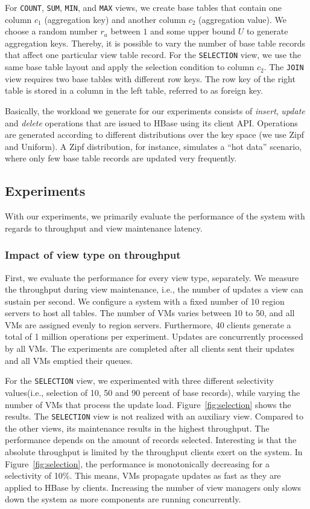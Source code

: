 For \texttt{COUNT}, \texttt{SUM}, \texttt{MIN}, and \texttt{MAX}
views, we create base tables that contain one column $c_1$
(aggregation key) and another column $c_2$ (aggregation value).  We
choose a random number $r_a$ between $1$ and some upper bound $U$ to
generate aggregation keys.  Thereby, it is possible to vary the number
of base table records that affect one particular view table
record. For the \texttt{SELECTION} view, we use the same base table
layout and apply the selection condition to column $c_2$. The
\texttt{JOIN} view requires two base tables with different row
keys. The row key of the right table is stored in a column in the left
table, referred to as foreign key.

Basically, the workload we generate for our experiments consists of
\textit{insert}, \textit{update} and \textit{delete} operations that
are issued to HBase using its client API. Operations are generated
according to different distributions over the key space (we use Zipf
and Uniform).  A Zipf distribution, for instance, simulates a ``hot
data'' scenario, where only few base table records are updated very
frequently.


\subsection{Experiments} 

With our experiments, we primarily evaluate the performance of the
system with regards to throughput and view maintenance latency.

\subsubsection{Impact of view type on throughput} 
First, we evaluate the
performance for every view type, separately. We measure the throughput
during view maintenance, i.e., the number of updates a view can
sustain per second.  We configure a system with a fixed number of 10
region servers to host all tables. The number of VMs varies between 10
to 50, and all VMs are assigned evenly to region servers. Furthermore,
40 clients generate a total of 1 million operations per
experiment. Updates are concurrently processed by all VMs. The
experiments are completed after all clients sent their updates and all
VMs emptied their queues.

For the \texttt{SELECTION} view, we experimented with three different
selectivity values(i.e., selection of 10, 50 and 90 percent of base
records), while varying the number of VMs that process the update
load. Figure~\ref{fig:selection} shows the results.  The
\texttt{SELECTION} view is not realized with an auxiliary
view. Compared to the other views, its maintenance results in the
highest throughput.  The performance depends on the amount of records
selected. Interesting is that the absolute throughput is limited by
the throughput clients exert on the system. In
Figure~\ref{fig:selection}, the performance is monotonically decreasing
for a selectivity of 10\%. This means, VMs propagate updates as fast
as they are applied to HBase by clients. Increasing the number of view
managers only slows down the system as more components are running
concurrently.

